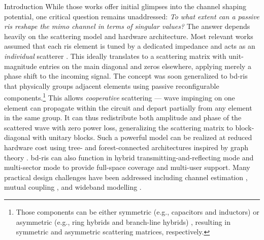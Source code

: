 \begin{section}{Introduction}
	While those works offer initial glimpses into the channel shaping potential, one critical question remains unaddressed: \emph{To what extent can a passive \gls{ris} reshape the \gls{mimo} channel in terms of singular values?}
	The answer depends heavily on the scattering model and hardware architecture.
	Most relevant works \cite{ElMossallamy2021,Meng2023,Zheng2022,Huang2023,Bafghi2022,Zheng2023,Chae2023,Wu2019,Santamaria2023a} assumed that each \gls{ris} element is tuned by a dedicated impedance and acts as an \emph{individual} scatterer \cite{Wu2020}.
	This ideally translates to a scattering matrix with unit-magnitude entries on the main diagonal and zeros elsewhere, applying merely a phase shift to the incoming signal.
	The concept was soon generalized to \gls{bd}-\gls{ris} \cite{Shen2020a} that physically groups adjacent elements using passive reconfigurable components.\footnote{Those components can be either symmetric (e.g., capacitors and inductors) or asymmetric (e.g., ring hybrids and branch-line hybrids) \cite{Ahn2006}, resulting in symmetric and asymmetric scattering matrices, respectively.}
	This allows \emph{cooperative} scattering --- wave impinging on one element can propagate within the circuit and depart partially from any element in the same group.
	It can thus redistribute both amplitude and phase of the scattered wave with zero power loss, generalizing the scattering matrix to block-diagonal with unitary blocks.
	Such a powerful model can be realized at reduced hardware cost using tree- and forest-connected architectures inspired by graph theory \cite{Nerini2024}.
	\gls{bd}-\gls{ris} can also function in hybrid transmitting-and-reflecting mode \cite{Li2023b} and multi-sector mode \cite{Li2023c} to provide full-space coverage and multi-user support.
	Many practical design challenges have been addressed including channel estimation \cite{Li2024}, mutual coupling \cite{Li2023f}, and wideband modelling \cite{Li2024a}.

\end{section}
